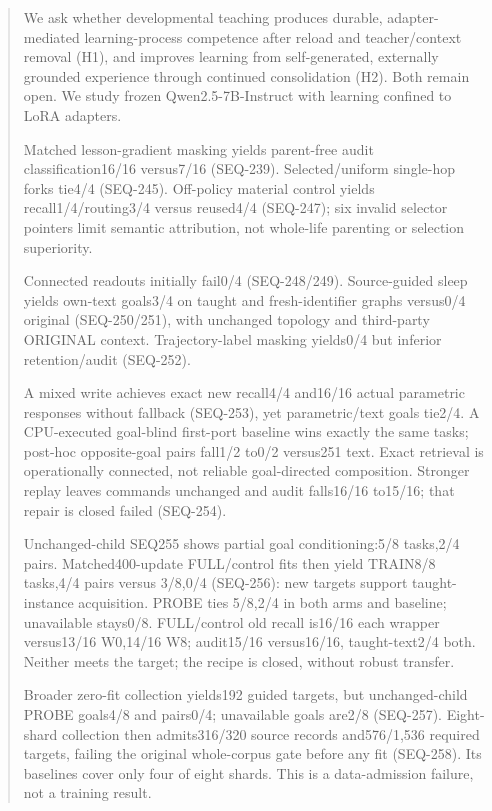 \documentclass[11pt]{article}
\begin{document}
\begin{abstract}
We ask whether developmental teaching produces durable, adapter-mediated
learning-process competence after reload and teacher/context removal (H1), and
improves learning from self-generated, externally grounded experience through
continued consolidation (H2). Both remain open. We study frozen
Qwen2.5-7B-Instruct with learning confined to LoRA adapters.

Matched lesson-gradient masking yields parent-free audit classification16/16
versus7/16 (SEQ-239). Selected/uniform single-hop forks tie4/4 (SEQ-245).
Off-policy material control yields recall1/4/routing3/4 versus reused4/4
(SEQ-247); six invalid selector pointers limit semantic attribution, not
whole-life parenting or selection superiority.

Connected readouts initially fail0/4 (SEQ-248/249). Source-guided sleep yields
own-text goals3/4 on taught and fresh-identifier graphs versus0/4 original
(SEQ-250/251), with unchanged topology and third-party ORIGINAL context.
Trajectory-label masking yields0/4 but inferior retention/audit (SEQ-252).

A mixed write achieves exact new recall4/4 and16/16 actual parametric responses
without fallback (SEQ-253), yet parametric/text goals tie2/4. A CPU-executed
goal-blind first-port baseline wins exactly the same tasks; post-hoc opposite-goal
pairs fall1/2 to0/2 versus251 text. Exact retrieval is operationally connected,
not reliable goal-directed composition. Stronger replay leaves commands unchanged
and audit falls16/16 to15/16; that repair is closed failed (SEQ-254).

Unchanged-child SEQ255 shows partial goal conditioning:5/8 tasks,2/4 pairs.
Matched400-update FULL/control fits then yield TRAIN8/8 tasks,4/4 pairs versus
3/8,0/4 (SEQ-256): new targets support taught-instance acquisition. PROBE ties
5/8,2/4 in both arms and baseline; unavailable stays0/8. FULL/control old recall
is16/16 each wrapper versus13/16 W0,14/16 W8; audit15/16 versus16/16, taught-text2/4
both. Neither meets the target; the recipe is closed, without robust transfer.

Broader zero-fit collection yields192 guided targets, but unchanged-child PROBE
goals4/8 and pairs0/4; unavailable goals are2/8 (SEQ-257). Eight-shard collection
then admits316/320 source records and576/1,536 required targets, failing the
original whole-corpus gate before any fit (SEQ-258). Its baselines cover only
four of eight shards. This is a data-admission failure, not a training result.


\end{abstract}
\end{document}
